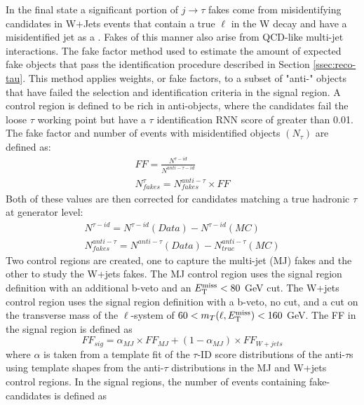 		In the \taulep final state a significant portion of $j \to \tau$ fakes come from misidentifying \tauhad candidates in W+Jets events that contain a true $\ell$ in the W decay and have a misidentified jet as a \tauhad. Fakes of this manner also arise from QCD-like multi-jet interactions. The fake factor method used to estimate the amount of expected fake \tauhad objects that pass the \tauhad identification procedure described in Section \ref{ssec:reco-tau}. This method applies weights, or fake factors, to a subset of "anti-\tauhad" objects that have failed the selection and identification criteria in the signal region. A control region is defined to be rich in anti-\tauhad objects, where the \tauhad candidates fail the loose $\tau$ working point but have a $\tau$ identification RNN score of greater than 0.01. The fake factor and number of events with misidentified \tauhad objects $(N_{\tau})$ are defined as:
		\begin{equation}\label{eqn:ff}\begin{split}
		FF = \frac{ N^{\tau-id} }{N^{anti-\tau-id}} \\
		N_{fakes}^{\tau} = N^{anti-\tau}_{fakes} \times FF
		\end{split}\end{equation}
		Both of these values are then corrected for \tauhad candidates matching a true hadronic $\tau$ at generator level:
		\begin{equation}\label{eqn:ff-corrected}\begin{split}
		N^{\tau-id} = N^{\tau-id}(Data) - N^{\tau-id}(MC) \\
		N^{anti-\tau}_{fakes} = N^{anti-\tau}(Data) - N^{anti-\tau}_{true} (MC)
		\end{split}\end{equation}
		Two control regions are created, one to capture the multi-jet (MJ) fakes and the other to study the W+jets fakes. The MJ control region uses the \taujets signal region definition with an additional b-veto and an $E_\text{T}^\text{miss} < 80$ GeV cut. The W+jets control region uses the \taulep signal region definition with a b-veto, no \Etm cut, and a cut on the transverse mass of the $\ell$-\Etm system of $60 < m_{T}(\ell, E_\text{T}^\text{miss})<160$ GeV.
		The FF in the signal region is defined as 
		\begin{equation}\label{eqn:ff-sig}
		FF_{sig} = \alpha_{MJ} \times FF_{MJ} + (1 - \alpha_{MJ}) \times FF_{W+jets}
		\end{equation}
		where $\alpha$ is taken from a template fit of the $\tau$-ID score distributions of the anti-$\tau$s using template shapes from the anti-$\tau$ distributions in the MJ and W+jets control regions. In the signal regions, the number of events containing fake-\tauhad candidates is defined as
